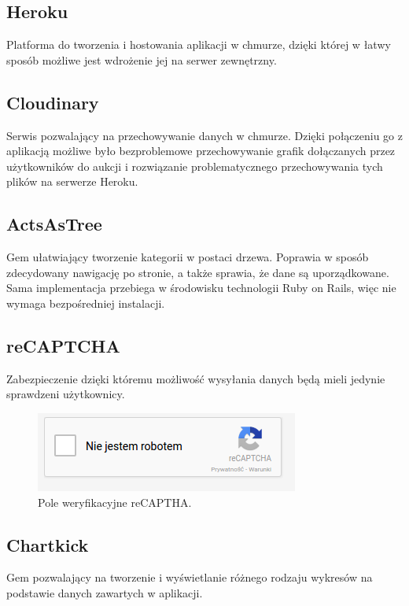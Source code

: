 \documentclass[brudnopis]{xmgr}
\begin{document}
\subsection{Heroku} 

Platforma do tworzenia i hostowania aplikacji w chmurze, dzięki której w łatwy sposób możliwe jest wdrożenie jej na serwer zewnętrzny.

\subsection{Cloudinary} 

Serwis pozwalający na przechowywanie danych w chmurze. Dzięki połączeniu go z aplikacją możliwe było bezproblemowe przechowywanie grafik dołączanych przez użytkowników do aukcji i rozwiązanie problematycznego przechowywania tych plików na serwerze Heroku.

\subsection{ActsAsTree} 

Gem ułatwiający tworzenie kategorii w postaci drzewa. Poprawia w sposób zdecydowany nawigację
po stronie, a także sprawia, że dane są uporządkowane. Sama implementacja przebiega w środowisku
technologii Ruby on Rails, więc nie wymaga bezpośredniej instalacji.
\newpage
\subsection{reCAPTCHA}

Zabezpieczenie dzięki któremu możliwość wysyłania danych będą mieli jedynie sprawdzeni użytkownicy.

\begin{figure}[!tbh]
\centering
\includegraphics[scale=0.8]{fig/captcha}
\caption{Pole weryfikacyjne reCAPTHA.}
\end{figure}


\subsection{Chartkick} 

Gem pozwalający na tworzenie i wyświetlanie różnego rodzaju wykresów na podstawie danych zawartych w aplikacji.
\end{document}
